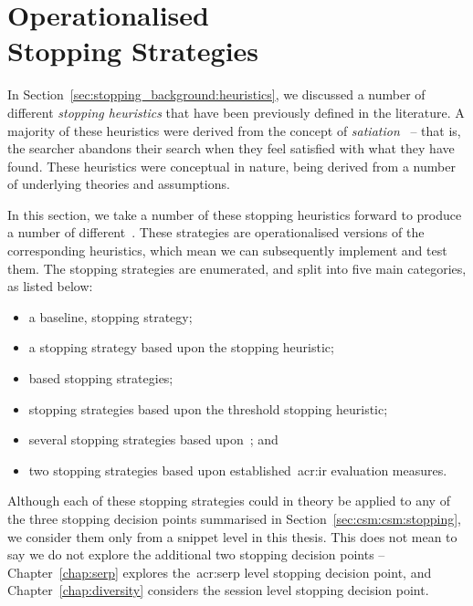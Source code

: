
\chapter[Operationalised Stopping Strategies]{Operationalised\\Stopping Strategies}\label{chap:strategies}
In Section~\ref{sec:stopping_background:heuristics}, we discussed a number of different \emph{stopping heuristics} that have been previously defined in the literature. A majority of these heuristics were derived from the concept of \emph{satiation}~\citep{simon1955satiation} -- that is, the searcher abandons their search when they feel satisfied with what they have found. These heuristics were conceptual in nature, being derived from a number of underlying theories and assumptions.

In this section, we take a number of these stopping heuristics forward to produce a number of different~. These strategies are operationalised versions of the corresponding heuristics, which mean we can subsequently implement and test them. The stopping strategies are enumerated, and split into five main categories, as listed below:

\begin{itemize}
    \item{a baseline,  stopping strategy;}
    \item{a stopping strategy based upon the  stopping heuristic;}
    \item{ based stopping strategies;}
    \item{stopping strategies based upon the  threshold stopping heuristic;}
    \item{several stopping strategies based upon~; and}
    \item{two stopping strategies based upon established~\gls{acr:ir} evaluation measures.}
\end{itemize}

Although each of these stopping strategies could in theory be applied to any of the three stopping decision points summarised in Section~\ref{sec:csm:csm:stopping}, we consider them only from a snippet level in this thesis. This does not mean to say we do not explore the additional two stopping decision points -- Chapter~\ref{chap:serp} explores the~\gls{acr:serp} level stopping decision point, and Chapter~\ref{chap:diversity} considers the session level stopping decision point.

